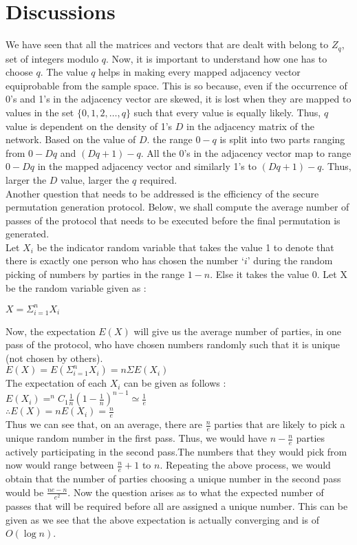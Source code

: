 \documentclass{llncs}
\begin{document}
\section{Discussions}
We have seen that all the matrices and vectors that are dealt with belong to   $Z_q$, set of integers modulo $q$. Now, it is important to understand how one has to choose $q$. The value $q$ helps in making every mapped adjacency vector equiprobable from the sample space. This is so because, even if the occurrence of 0's and 1's in the adjacency vector are skewed, it is lost when they are mapped to values in the set $\{0,1,2, \dots ,q\}$ such that every value is equally likely. Thus, $q$ value is dependent on the density of 1's $D$ in the adjacency matrix of the network. Based on the value of $D$. the range $0-q$ is split into two parts ranging from $0-Dq$ and $(Dq+1)-q$. All the 0's in the adjacency vector map to range $0-Dq$ in the mapped adjacency vector and similarly 1's to $(Dq+1)-q$. Thus, larger the $D$ value, larger the $q$ required. \\

Another question that needs to be addressed is the efficiency of the secure permutation generation protocol. Below, we shall compute the average number of passes of the protocol that needs to be executed before the final permutation is generated.\\
Let $X_i$ be the indicator random variable that takes the value 1 to denote that there is exactly one person who has chosen the number ‘$i$’ during the random picking of numbers by parties in the range $1-n$. Else it takes the value 0. Let X be the random variable given as :\\
\begin{center}
   $ X   =   \Sigma^n_{i=1} X_i$
\end{center}
Now, the expectation $E(X)$ will give us the average number of parties, in one pass of the protocol, who have chosen numbers randomly such that it is unique (not chosen by others). \\
$E(X)   =   E(\Sigma^n_{i=1} X_i)   =  n\Sigma E(X_i)$ \\
The expectation of each $X_i$  can be given as follows : \\
$E(X_i)  =    ^nC_1\frac{1}{n}(1-\frac{1}{n})^{n-1}   \simeq \frac{1}{e}$ \\
$\therefore  E(X)  =   nE(X_i) =  \frac{n}{e}$ \\
Thus we can see that, on an average, there are $\frac{n}{e}$ parties that are likely to pick a unique random number in the first pass. Thus, we would have $n-\frac{n}{e}$ parties actively participating in the second pass.The numbers that they would pick from now would range between $\frac{n}{e} +1$ to $n$. Repeating the above process, we would obtain that the number of parties choosing a unique number in the second pass would be $\frac{ne-n}{e^2}$. 
Now the question arises as to what the expected number of passes that will be required before all are assigned a unique number. This can be given as we see that the above expectation is actually converging and is of $O(\log n)$.
   
\end{document}
